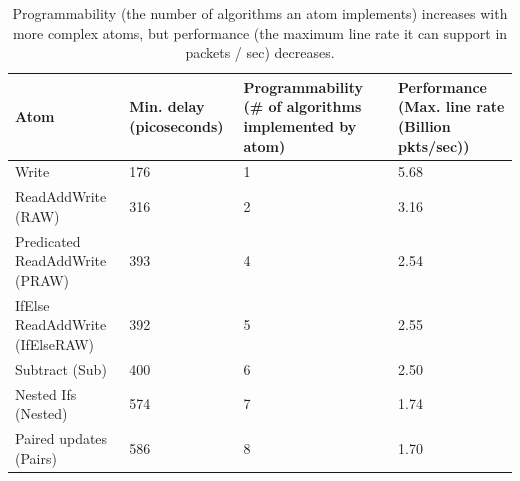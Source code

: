 \begin{table}[!t]
  \begin{scriptsize}
  \begin{tabular}{|p{}|p{}|p{}|p{}|}
  \hline
  Atom & Min. delay (picoseconds) & Programmability (\# of algorithms implemented by atom) & Performance (Max. line rate (Billion pkts/sec)) \\
  \hline
  Write & 176 & 1  & 5.68 \\
  \hline
  ReadAddWrite (RAW) & 316 & 2 & 3.16\\
  \hline
  \pbox{0.1\textwidth}
  {Predicated\\
  ReadAddWrite (PRAW)} & 393 & 4 & 2.54 \\
  \hline
  IfElse ReadAddWrite (IfElseRAW) & 392 & 5 & 2.55 \\
  \hline
  Subtract (Sub) & 400 & 6 & 2.50 \\
  \hline
  Nested Ifs (Nested) & 574 & 7 & 1.74 \\
  \hline
  Paired updates (Pairs) & 586 & 8 & 1.70 \\
  \hline
  \end{tabular}
\end{scriptsize}
\caption{Programmability (the number of algorithms an atom implements)
increases with more complex atoms, but performance (the maximum line rate it
can support in packets / sec) decreases.}
\label{tab:perfprog}
\end{table}

